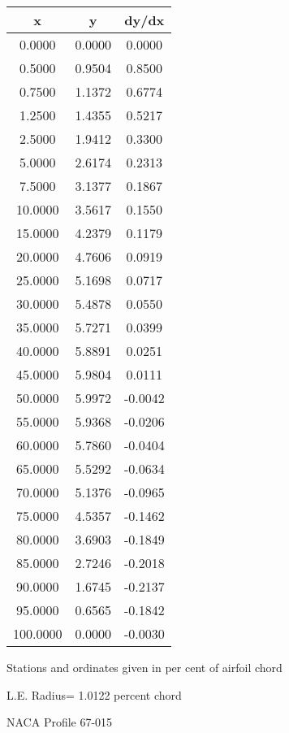 \documentclass[11pt]{book}
\begin{document}
 \vspace{8mm}
 \begin{tabular}{|c|c|c|} \hline 
  x  &  y  &  dy/dx \\
 \hline
0.0000 & 0.0000 & 0.0000 \\
0.5000 & 0.9504 & 0.8500 \\
0.7500 & 1.1372 & 0.6774 \\
1.2500 & 1.4355 & 0.5217 \\
2.5000 & 1.9412 & 0.3300 \\
5.0000 & 2.6174 & 0.2313 \\
7.5000 & 3.1377 & 0.1867 \\
10.0000 & 3.5617 & 0.1550 \\
15.0000 & 4.2379 & 0.1179 \\
20.0000 & 4.7606 & 0.0919 \\
25.0000 & 5.1698 & 0.0717 \\
30.0000 & 5.4878 & 0.0550 \\
35.0000 & 5.7271 & 0.0399 \\
40.0000 & 5.8891 & 0.0251 \\
45.0000 & 5.9804 & 0.0111 \\
50.0000 & 5.9972 & -0.0042 \\
55.0000 & 5.9368 & -0.0206 \\
60.0000 & 5.7860 & -0.0404 \\
65.0000 & 5.5292 & -0.0634 \\
70.0000 & 5.1376 & -0.0965 \\
75.0000 & 4.5357 & -0.1462 \\
80.0000 & 3.6903 & -0.1849 \\
85.0000 & 2.7246 & -0.2018 \\
90.0000 & 1.6745 & -0.2137 \\
95.0000 & 0.6565 & -0.1842 \\
100.0000 & 0.0000 & -0.0030 \\
 \hline
 \end{tabular}
 \vspace{8mm}


Stations and ordinates given in per cent of airfoil chord 


L.E. Radius=  1.0122 percent chord
 \newpage
  \label{p67-015}
 \begin{Large}
 NACA Profile 67-015
 \end{Large}
  
\end{document}
